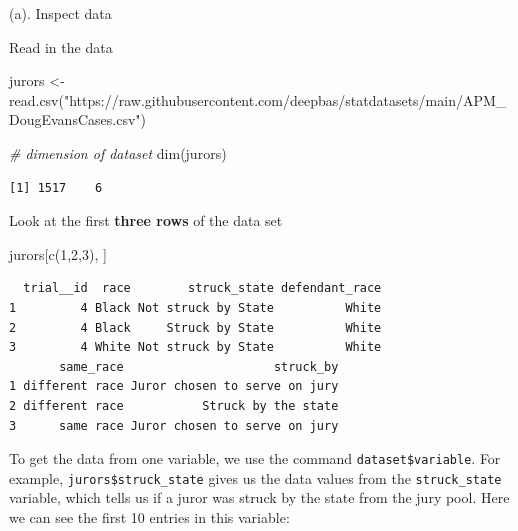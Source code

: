 \documentclass[
]{book}
\newenvironment{Shaded}{\begin{snugshade}}{\end{snugshade}}
\newcommand{\CommentTok}[1]{\textcolor[rgb]{0.56,0.35,0.01}{\textit{#1}}}
\newcommand{\DecValTok}[1]{\textcolor[rgb]{0.00,0.00,0.81}{#1}}
\newcommand{\FunctionTok}[1]{\textcolor[rgb]{0.00,0.00,0.00}{#1}}
\newcommand{\NormalTok}[1]{#1}
\newcommand{\OtherTok}[1]{\textcolor[rgb]{0.56,0.35,0.01}{#1}}
\newcommand{\SpecialCharTok}[1]{\textcolor[rgb]{0.00,0.00,0.00}{#1}}
\newcommand{\StringTok}[1]{\textcolor[rgb]{0.31,0.60,0.02}{#1}}
\begin{document}
(a). Inspect data

Read in the data

\begin{Shaded}
\begin{Highlighting}[]
\NormalTok{jurors }\OtherTok{\textless{}{-}} \FunctionTok{read.csv}\NormalTok{(}\StringTok{"https://raw.githubusercontent.com/deepbas/statdatasets/main/APM\_DougEvansCases.csv"}\NormalTok{)}
\end{Highlighting}
\end{Shaded}

\begin{Shaded}
\begin{Highlighting}[]
\CommentTok{\# dimension of dataset}
\FunctionTok{dim}\NormalTok{(jurors)}
\end{Highlighting}
\end{Shaded}

\begin{verbatim}
[1] 1517    6
\end{verbatim}

Look at the first \textbf{three rows} of the data set

\begin{Shaded}
\begin{Highlighting}[]
\NormalTok{jurors[}\FunctionTok{c}\NormalTok{(}\DecValTok{1}\NormalTok{,}\DecValTok{2}\NormalTok{,}\DecValTok{3}\NormalTok{), ]}
\end{Highlighting}
\end{Shaded}

\begin{verbatim}
  trial__id  race        struck_state defendant_race
1         4 Black Not struck by State          White
2         4 Black     Struck by State          White
3         4 White Not struck by State          White
       same_race                     struck_by
1 different race Juror chosen to serve on jury
2 different race           Struck by the state
3      same race Juror chosen to serve on jury
\end{verbatim}

To get the data from one variable, we use the command \texttt{dataset\$variable}. For example, \texttt{jurors\$struck\_state} gives us the data values from the \texttt{struck\_state} variable, which tells us if a juror was struck by the state from the jury pool. Here we can see the first 10 entries in this variable:

\begin{Shaded}
\end{Shaded}
\end{document}
